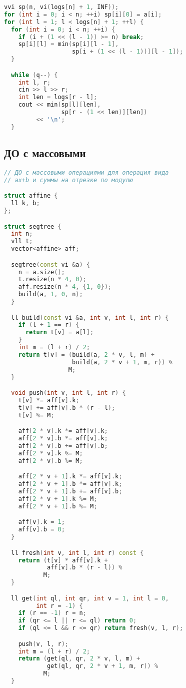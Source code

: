 \documentclass[10pt,a4paper,landscape,twosided]{extarticle}
\begin{document}
\begin{multicols}{3}
\begin{lstlisting}[language=C++]
vvi sp(n, vi(logs[n] + 1, INF));
for (int i = 0; i < n; ++i) sp[i][0] = a[i];
for (int l = 1; l < logs[n] + 1; ++l) {
  for (int i = 0; i < n; ++i) {
    if (i + (1 << (l - 1)) >= n) break;
    sp[i][l] = min(sp[i][l - 1],
                   sp[i + (1 << (l - 1))][l - 1]);
  }

  while (q--) {
    int l, r;
    cin >> l >> r;
    int len = logs[r - l];
    cout << min(sp[l][len],
                sp[r - (1 << len)][len])
         << '\n';
  }
\end{lstlisting}

\subsection{ДО с массовыми}
\begin{lstlisting}[language=C++]
// ДО с массовыми операциями для операция вида
// ax+b и суммы на отрезке по модулю

struct affine {
  ll k, b;
};

struct segtree {
  int n;
  vll t;
  vector<affine> aff;

  segtree(const vi &a) {
    n = a.size();
    t.resize(n * 4, 0);
    aff.resize(n * 4, {1, 0});
    build(a, 1, 0, n);
  }

  ll build(const vi &a, int v, int l, int r) {
    if (l + 1 == r) {
      return t[v] = a[l];
    }
    int m = (l + r) / 2;
    return t[v] = (build(a, 2 * v, l, m) +
                   build(a, 2 * v + 1, m, r)) %
                  M;
  }

  void push(int v, int l, int r) {
    t[v] *= aff[v].k;
    t[v] += aff[v].b * (r - l);
    t[v] %= M;

    aff[2 * v].k *= aff[v].k;
    aff[2 * v].b *= aff[v].k;
    aff[2 * v].b += aff[v].b;
    aff[2 * v].k %= M;
    aff[2 * v].b %= M;

    aff[2 * v + 1].k *= aff[v].k;
    aff[2 * v + 1].b *= aff[v].k;
    aff[2 * v + 1].b += aff[v].b;
    aff[2 * v + 1].k %= M;
    aff[2 * v + 1].b %= M;

    aff[v].k = 1;
    aff[v].b = 0;
  }

  ll fresh(int v, int l, int r) const {
    return (t[v] * aff[v].k +
            aff[v].b * (r - l)) %
           M;
  }

  ll get(int ql, int qr, int v = 1, int l = 0,
         int r = -1) {
    if (r == -1) r = n;
    if (qr <= l || r <= ql) return 0;
    if (ql <= l && r <= qr) return fresh(v, l, r);

    push(v, l, r);
    int m = (l + r) / 2;
    return (get(ql, qr, 2 * v, l, m) +
            get(ql, qr, 2 * v + 1, m, r)) %
           M;
  }


\end{lstlisting}
\end{multicols}
\end{document}
